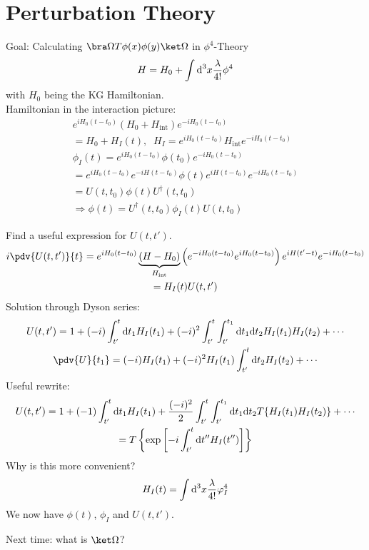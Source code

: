 \documentclass[]{scrartcl}
\begin{document}
\section{Perturbation Theory}
Goal: Calculating $\bra\Omega T\phi(x)\phi(y)\ket\Omega$ in $\phi^4$-Theory
$$
H = H_0 + \int \text d^3x \frac{\lambda}{4!}\phi^4
$$
with $H_0$ being the KG Hamiltonian.\\
Hamiltonian in the interaction picture:
\begin{gather}
	e^{iH_0(t-t_0)}(H_0 + H_\text{int})e^{-iH_0(t-t_0)}\\
	= H_0 + H_I(t),\;\; H_I = e^{iH_0(t-t_0)}H_\text{int}e^{-iH_0(t-t_0)}\\
	\phi_I(t) = e^{iH_0(t-t_0)}\phi(t_0)e^{-iH_0(t-t_0)}\\
		= e^{iH_0(t-t_0)}e^{-iH(t-t_0)}\phi(t)e^{iH(t-t_0)}e^{-iH_0(t-t_0)}\\
		= U(t,t_0)\phi(t)U^\dagger(t,t_0)\\
		\Rightarrow \phi(t) = U^\dagger(t,t_0)\phi_I(t)U(t,t_0)
\end{gather}

Find a useful expression for $U(t,t')$.
\begin{gather}
	i\pdv{U(t,t')}{t} = e^{iH_0(t-t_0)}\underbrace{(H-H_0)}_{H_\text{int}}\left(e^{-iH_0(t-t_0)}e^{iH_0(t-t_0)}\right)e^{iH(t'-t)}e^{-iH_0(t-t_0)}\\
	= H_I(t) U(t,t')
\end{gather}
Solution through Dyson series:
\begin{gather}
	U(t,t') = 1 + (-i)\int_{t'}^t \text dt_1 H_I(t_1) + (-i)^2 \int_{t'}^t\int_{t'}^{t_1}\text dt_1 \text dt_2 H_I(t_1)H_I(t_2) + \cdots\\
	\pdv{U}{t_1} = (-i)H_I(t_1) + (-i)^2 H_I(t_1)\int_{t'}^t \text d t_2 H_I(t_2) + \cdots
\end{gather}
Useful rewrite:
\begin{gather}
	U(t,t') = 1 + (-1) \int_{t'}^t \text dt_1 H_I(t_1) + \frac{(-i)^2}{2}\int_{t'}^t\int_{t'}^{t_1}\text dt_1 \text dt_2 T\{H_I(t_1)H_I(t_2)\} + \cdots\\
	= T\left\{\exp\left[-i\int_{t'}^t \text dt''H_I(t'')\right]\right\}
\end{gather}
Why is this more convenient?
\begin{equation}
	H_I(t) = \int \text d^3x \frac{\lambda}{4!}\varphi_I^4
\end{equation}
We now have $\phi(t)$, $\phi_I$ and $U(t,t')$.

Next time: what is $\ket\Omega$?
\end{document}
